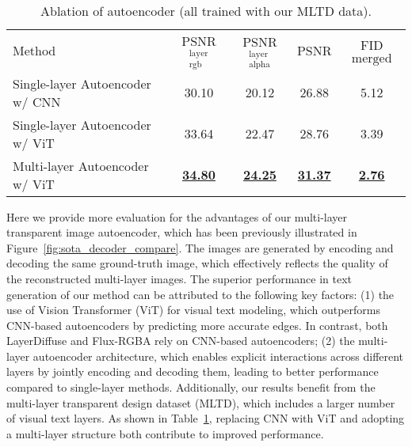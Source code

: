 \begin{table}[htbp]
\vspace{-4mm}
\begin{minipage}[t]{1\linewidth}  
\centering 
{}
\resizebox{0.99\linewidth}{!}
{
\begin{tabular}{l|c|ccc}  
Method & PSNR{$^{\textrm{layer}}_{\textrm{rgb}}$} & PSNR{$^{\textrm{layer}}_{\textrm{alpha}}$} & PSNR & FID$\scriptstyle \text{merged}$ \\
\shline
Single-layer Autoencoder w/ CNN  & 30.10 & 20.12 & 26.88 & 5.12 \\
Single-layer Autoencoder w/ ViT  & 33.64 & 22.47 & 28.76 & 3.39 \\
Multi-layer Autoencoder w/ ViT & \underline{\textbf{34.80}} & \underline{\textbf{24.25}} & \underline{\textbf{31.37}} & \underline{\textbf{2.76}} \\
\end{tabular}
}
\vspace{-2mm}
\caption{
\footnotesize{Ablation of autoencoder (all trained with our MLTD data).}}
\label{tab:text_decoder_comparison}
\end{minipage}
\vspace{-4mm}
\end{table}



Here we provide more evaluation 
for the advantages of our multi-layer transparent image autoencoder, which has been previously illustrated in Figure~\ref{fig:sota_decoder_compare}. The images are generated by encoding and decoding the same ground-truth image, which effectively reflects the quality of the reconstructed multi-layer images. The superior performance in text generation of our method can be attributed to the following key factors: (1) the use of Vision Transformer (ViT) for visual text modeling, which outperforms CNN-based autoencoders by predicting more accurate edges. In contrast, both LayerDiffuse and Flux-RGBA rely on CNN-based autoencoders; (2) the multi-layer autoencoder architecture, which enables explicit interactions across different layers by jointly encoding and decoding them, leading to better performance compared to single-layer methods. Additionally, our results benefit from the multi-layer transparent design dataset (MLTD), which includes a larger number of visual text layers. As shown in Table~\ref{tab:text_decoder_comparison}, replacing CNN with ViT and adopting a multi-layer structure both contribute to improved performance.



